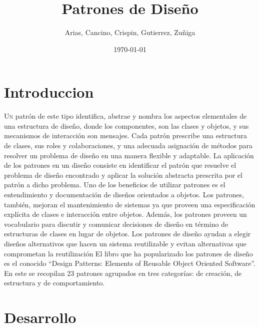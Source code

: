 \documentclass[twoside,twocolumn]{article}
\title{Patrones de Diseño} %
\author{Arias, Cancino, Crispin, Gutierrez, Zuñiga}
\date{\today} %
\begin{document}
\maketitle


\section{Introduccion}

\lettrine[nindent=0em,lines=3]{U}n patrón de este tipo identifica, abstrae y nombra los aspectos elementales de una estructura de diseño, donde los componentes, son las clases y objetos, y sus mecanismos de interacción son mensajes.  
Cada patrón prescribe una estructura de clases, sus roles y colaboraciones, y una adecuada asignación de métodos para resolver un problema de diseño en una manera flexible y adaptable.  
La aplicación de los patrones en un diseño consiste en identificar el patrón que resuelve el problema de diseño encontrado y aplicar la solución abstracta prescrita por el patrón a dicho problema. 
Uno de los beneficios de utilizar patrones es el entendimiento y documentación de diseños orientados a objetos. Los patrones, también, mejoran el mantenimiento de sistemas ya que proveen una especificación explícita de clases e interacción entre objetos. Además, los patrones proveen un vocabulario para discutir y comunicar decisiones de diseño en término de estructuras de clases en lugar de objetos.  
Los patrones de diseño ayudan a elegir diseños alternativos que hacen un sistema reutilizable y evitan alternativas que comprometan la reutilización  
El libro que ha popularizado los patrones de diseño es el conocido “Design Patterns: Elements of Reusable Object Oriented Software”. En este se recopilan 23 patrones agrupados en tres categorías: de creación, de estructura y de comportamiento.
\section{Desarrollo}
\end{document}
